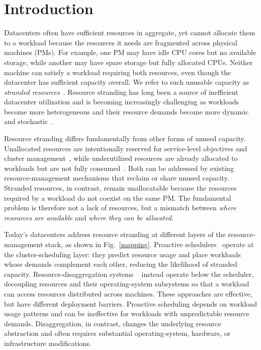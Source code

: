 \documentclass[sigplan,10pt]{acmart}
\begin{document}
\section{Introduction}\label{intro}

Datacenters often have sufficient resources in aggregate, yet cannot allocate them to a workload because the resources it needs are fragmented across physical machines (PMs). For example, one PM may have idle CPU cores but no available storage, while another may have spare storage but fully allocated CPUs. Neither machine can satisfy a workload requiring both resources, even though the datacenter has sufficient capacity overall. We refer to such unusable capacity as \emph{stranded resources}~\cite{coach, legoos, faasmem}. Resource stranding has long been a source of inefficient datacenter utilization and is becoming increasingly challenging as workloads become more heterogeneous and their resource demands become more dynamic and stochastic~\cite{agentcgroup, pond}.

Resource stranding differs fundamentally from other forms of unused capacity. Unallocated resources are intentionally reserved for service-level objectives and cluster management~\cite{lazy, derm, dynamo, mgr}, while underutilized resources are already allocated to workloads but are not fully consumed~\cite{harvestvm, memory}. Both can be addressed by existing resource-management mechanisms that reclaim or share unused capacity. Stranded resources, in contrast, remain unallocatable because the resources required by a workload do not coexist on the same PM. The fundamental problem is therefore not a lack of resources, but a mismatch between \emph{where resources are available} and \emph{where they can be allocated}.

Today's datacenters address resource stranding at different layers of the resource-management stack, as shown in Fig.~\ref{mapping}. Proactive schedulers~\cite{coach, resourcecentral, protean} operate at the cluster-scheduling layer: they predict resource usage and place workloads whose demands complement each other, reducing the likelihood of stranded capacity. Resource-disaggregation systems ~\cite{legoos, pond, fractos} instead operate below the scheduler, decoupling resources and their operating-system subsystems so that a workload can access resources distributed across machines. These approaches are effective, but have different deployment barriers. Proactive scheduling depends on workload usage patterns and can be ineffective for workloads with unpredictable resource demands. Disaggregation, in contrast, changes the underlying resource abstraction and often requires substantial operating-system, hardware, or infrastructure modifications.
\end{document}
